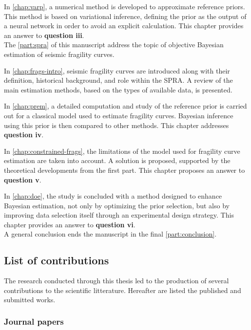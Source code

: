 \noindent
In \cref{chap:varp}, a numerical method is developed to approximate reference priors. This method is based on variational inference, defining the prior as the output of a neural network in order to avoid an explicit calculation. This chapter provides an answer to \textbf{question iii}.\\


The \cref{part:spra}
of this manuscript address the topic of objective Bayesian estimation of seismic fragility curves.

\noindent
In \cref{chap:frags-intro}, seismic fragility curves are introduced along with their definition, historical background, and role within the SPRA. A review of the main estimation methods, based on the types of available data, is presented.

\noindent
In \cref{chap:prem}, a detailed computation and study of the reference prior is carried out for a classical model used to estimate fragility curves. Bayesian inference using this prior is then compared to other methods. This chapter addresses \textbf{question iv}.

\noindent
In \cref{chap:constrained-frags}, the limitations of the model used for fragility curve estimation are taken into account. A solution is proposed, supported by the theoretical developments from the first part. This chapter proposes an answer to \textbf{question v}.

\noindent
In \cref{chap:doe}, the study is concluded with a method designed to enhance Bayesian estimation, not only by optimizing the prior selection, but also by improving data selection itself through an experimental design strategy. This chapter provides an answer to \textbf{question vi}.\\

A general conclusion ends the manuscript in the final \cref{part:conclusion}.



\subsection{List of contributions}


The research conducted through this thesis led to the production of several contributions to the scientific litterature. Hereafter are listed the published and submitted works.



\subsubsection{Journal papers}



